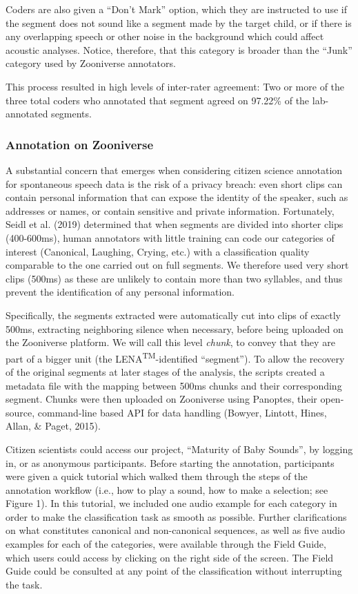 \documentclass[english,,man]{apa6}
\begin{document}
Coders are also given a \enquote{Don't Mark} option, which they are instructed to use if the segment does not sound like a segment made by the target child, or if there is any overlapping speech or other noise in the background which could affect acoustic analyses. Notice, therefore, that this category is broader than the \enquote{Junk} category used by Zooniverse annotators.

This process resulted in high levels of inter-rater agreement: Two or more of the three total coders who annotated that segment agreed on 97.22\% of the lab-annotated segments.

\hypertarget{annotation-on-zooniverse}{%
\subsubsection{Annotation on Zooniverse}\label{annotation-on-zooniverse}}

A substantial concern that emerges when considering citizen science annotation for spontaneous speech data is the risk of a privacy breach: even short clips can contain personal information that can expose the identity of the speaker, such as addresses or names, or contain sensitive and private information. Fortunately, Seidl et al. (2019) determined that when segments are divided into shorter clips (400-600ms), human annotators with little training can code our categories of interest (Canonical, Laughing, Crying, etc.) with a classification quality comparable to the one carried out on full segments. We therefore used very short clips (500ms) as these are unlikely to contain more than two syllables, and thus prevent the identification of any personal information.

Specifically, the segments extracted were automatically cut into clips of exactly 500ms, extracting neighboring silence when necessary, before being uploaded on the Zooniverse platform. We will call this level \emph{chunk}, to convey that they are part of a bigger unit (the LENA\textsuperscript{TM}-identified \enquote{segment}). To allow the recovery of the original segments at later stages of the analysis, the scripts created a metadata file with the mapping between 500ms chunks and their corresponding segment. Chunks were then uploaded on Zooniverse using Panoptes, their open-source, command-line based API for data handling (Bowyer, Lintott, Hines, Allan, \& Paget, 2015).

Citizen scientists could access our project, \enquote{Maturity of Baby Sounds}, by logging in, or as anonymous participants. Before starting the annotation, participants were given a quick tutorial which walked them through the steps of the annotation workflow (i.e., how to play a sound, how to make a selection; see Figure 1). In this tutorial, we included one audio example for each category in order to make the classification task as smooth as possible. Further clarifications on what constitutes canonical and non-canonical sequences, as well as five audio examples for each of the categories, were available through the Field Guide, which users could access by clicking on the right side of the screen. The Field Guide could be consulted at any point of the classification without interrupting the task.
\end{document}
